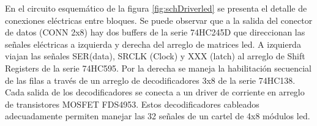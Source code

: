 En el circuito esquemático de la figura \ref{fig:schDriverled} se presenta el detalle de conexiones eléctricas entre bloques. Se puede observar que a la salida del conector de datos (CONN 2x8) hay dos buffers de la serie 74HC245D que direccionan las señales eléctricas a izquierda y derecha del arreglo de matrices led. A izquierda viajan las señales SER(data), SRCLK (Clock) y XXX (latch) al arreglo de Shift Registers de la serie 74HC595. Por la derecha se maneja la habilitación secuencial de las filas a través de un arreglo de decodificadores 3x8 de la serie 74HC138. Cada salida de los decodificadores se conecta a un driver de corriente en arreglo de transistores MOSFET FDS4953. Estos decodificadores cableados adecuadamente permiten manejar las 32 señales de un cartel de 4x8 módulos led. \\
%
%


